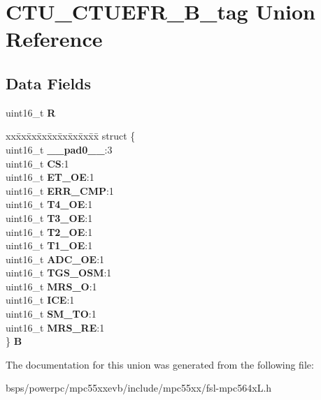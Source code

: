 \hypertarget{unionCTU__CTUEFR__16B__tag}{}\section{C\+T\+U\+\_\+\+C\+T\+U\+E\+F\+R\+\_\+B\+\_\+tag Union Reference}
\label{unionCTU__CTUEFR__16B__tag}
\subsection*{Data Fields}
\begin{DoxyCompactItemize}
\item 
\mbox{\label{unionCTU__CTUEFR__16B__tag_a88dc12992d5b106f822829fcbeee7eff}} 
uint16\+\_\+t {\bfseries R}
\item 
\mbox{\label{unionCTU__CTUEFR__16B__tag_aedecc55141340ac79e0e822c397df3f9}} 
\begin{tabbing}
xx\=xx\=xx\=xx\=xx\=xx\=xx\=xx\=xx\=\kill
struct \{\\
\>uint16\_t {\bfseries \_\_pad0\_\_}:3\\
\>uint16\_t {\bfseries CS}:1\\
\>uint16\_t {\bfseries ET\_OE}:1\\
\>uint16\_t {\bfseries ERR\_CMP}:1\\
\>uint16\_t {\bfseries T4\_OE}:1\\
\>uint16\_t {\bfseries T3\_OE}:1\\
\>uint16\_t {\bfseries T2\_OE}:1\\
\>uint16\_t {\bfseries T1\_OE}:1\\
\>uint16\_t {\bfseries ADC\_OE}:1\\
\>uint16\_t {\bfseries TGS\_OSM}:1\\
\>uint16\_t {\bfseries MRS\_O}:1\\
\>uint16\_t {\bfseries ICE}:1\\
\>uint16\_t {\bfseries SM\_TO}:1\\
\>uint16\_t {\bfseries MRS\_RE}:1\\
\} {\bfseries B}\\

\end{tabbing}\end{DoxyCompactItemize}


The documentation for this union was generated from the following file\+:\begin{DoxyCompactItemize}
\item 
bsps/powerpc/mpc55xxevb/include/mpc55xx/fsl-\/mpc564x\+L.\+h\end{DoxyCompactItemize}
